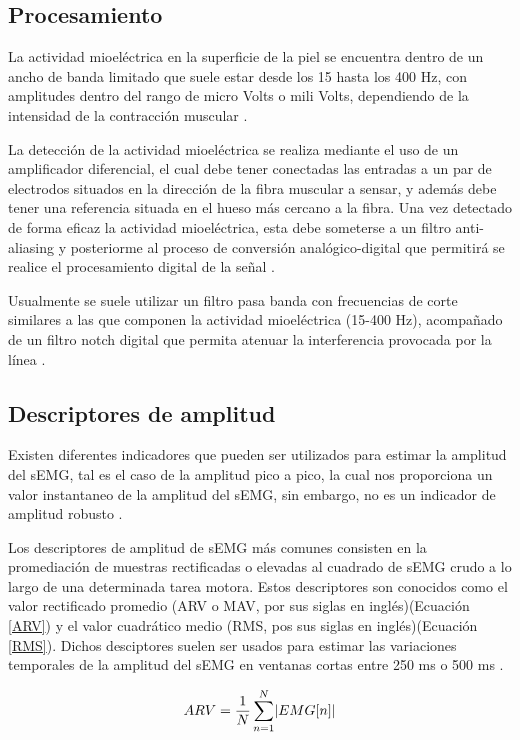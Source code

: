 \subsection{Procesamiento}
La actividad mioeléctrica en la superficie de la piel se encuentra dentro de un ancho de banda limitado que suele estar desde los 15 hasta los 400 Hz, con amplitudes dentro del rango de micro Volts o mili Volts, dependiendo de la intensidad de la contracción muscular \cite{Cavalcanti-Garcia2009}.

La detección de la actividad mioeléctrica se realiza mediante el uso de un amplificador diferencial, el cual debe tener conectadas las entradas a un par de electrodos situados en la dirección de la fibra muscular a sensar, y además debe tener una referencia situada en el hueso más cercano a la fibra. Una vez detectado de forma eficaz la actividad mioeléctrica, esta debe someterse a un filtro anti-aliasing y posteriorme al proceso de conversión analógico-digital que permitirá se realice el procesamiento digital de la señal \cite{Cavalcanti-Garcia2009}.

Usualmente se suele utilizar un filtro pasa banda con frecuencias de corte similares a las que componen la actividad mioeléctrica (15-400 Hz), acompañado de un filtro notch digital que permita atenuar la interferencia provocada por la línea \cite{Cavalcanti-Garcia2009}.

\subsection{Descriptores de amplitud}
Existen diferentes indicadores que pueden ser utilizados para estimar la amplitud del sEMG, tal es el caso de la amplitud pico a pico, la cual nos proporciona un valor instantaneo de la amplitud del sEMG, sin embargo, no es un indicador de amplitud robusto \cite{Cavalcanti-Garcia2009}.

Los descriptores de amplitud de sEMG más comunes consisten en la promediación de muestras rectificadas o elevadas al cuadrado de sEMG crudo a lo largo de una determinada tarea motora. Estos descriptores son conocidos como el valor rectificado promedio (ARV o MAV, por sus siglas en inglés)(Ecuación \ref{ARV}) y el valor cuadrático medio (RMS, pos sus siglas en inglés)(Ecuación \ref{RMS}). Dichos desciptores suelen ser usados para estimar las variaciones temporales de la amplitud del sEMG en ventanas cortas entre 250 ms o 500 ms \cite{Cavalcanti-Garcia2009}.

\begin{equation}
	ARV = \frac{1}{N} \sum_{n=1}^{N} \lvert EMG[n]\rvert
	\label{ARV}
\end{equation}

